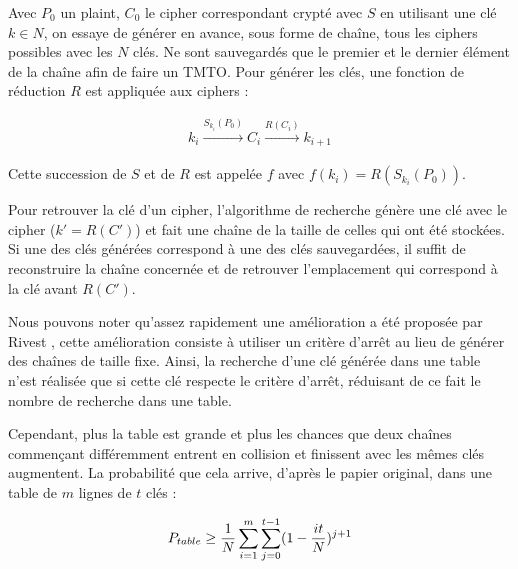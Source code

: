 

		Avec $P_0$ un \gls{plaint}, $C_0$ le \gls{cipher} correspondant crypté avec $S$ en utilisant une clé $k \in N$, on essaye de générer en avance, sous forme de chaîne, tous les \glspl{cipher} possibles avec les $N$ clés. Ne sont sauvegardés que le premier et le dernier élément de la chaîne afin de faire un \gls{TMTO}. Pour générer les clés, une fonction de réduction $R$ est appliquée aux \glspl{cipher} :

		\begin{align*}
			k_i \overset{S_{k_i}(P_0)}{\longrightarrow} C_i \overset{R(C_i)}{\longrightarrow} k_{i+1}
		\end{align*}

		Cette succession de $S$ et de $R$ est appelée $f$ avec $f(k_i) = R(S_{k_i}(P_0))$.

		\bigskip

		Pour retrouver la clé d'un \gls{cipher}, l'algorithme de recherche génère une clé avec le \gls{cipher} ($k' = R(C')$) et fait une chaîne de la taille de celles qui ont été stockées. Si une des clés générées correspond à une des clés sauvegardées, il suffit de reconstruire la chaîne concernée et de retrouver l'emplacement qui correspond à la clé avant $R(C')$.


		Nous pouvons noter qu'assez rapidement une amélioration a été proposée par Rivest \cite{Rivest}, cette amélioration consiste à utiliser un critère d'arrêt au lieu de générer des chaînes de taille fixe. Ainsi, la recherche d'une clé générée dans une table n'est réalisée que si cette clé respecte le critère d'arrêt, réduisant de ce fait le nombre de recherche dans une table.

		\bigskip

		Cependant, plus la table est grande et plus les chances que deux chaînes commençant différemment entrent en collision et finissent avec les mêmes clés augmentent. La probabilité que cela arrive, d'après le papier original\cite{ehellman}, dans une table de $m$ lignes de $t$ clés :

		\bigskip

		\begin{align*}
			P_{table} \ge{} \frac{1}{N} \sum\limits_{i=1}^{m}\sum\limits_{j=0}^{t-1} (1 - \frac{it}{N})^{j+1}
		\end{align*}

		\bigskip

